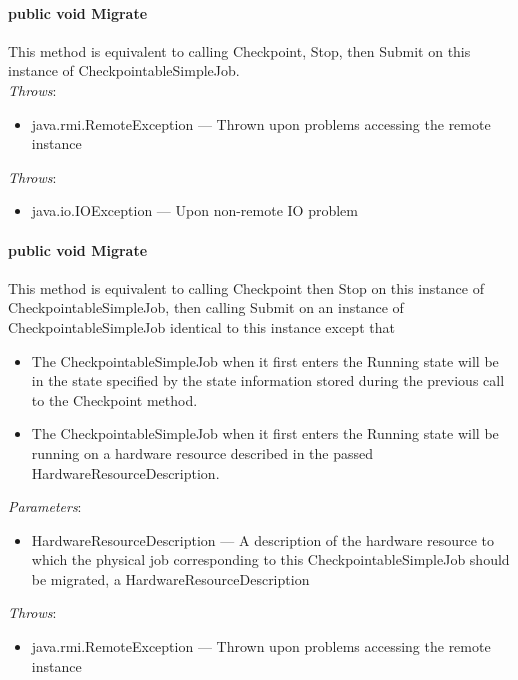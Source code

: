 \documentclass[$Date: 2003/06/26 19:29:31 $]{glabarticle}
\begin{document}
\paragraph{public void Migrate}

This method is equivalent to calling Checkpoint, Stop, then Submit on
this instance of CheckpointableSimpleJob. \\

 \textit{Throws}:
 \begin{itemize}
 \item[] java.rmi.RemoteException --- Thrown upon problems accessing the remote instance 
 \end{itemize}
 
\textit{Throws}:
\begin{itemize}
\item[] java.io.IOException --- Upon non-remote IO problem 
\end{itemize} 

\paragraph{public void Migrate}

This method is equivalent to calling Checkpoint then Stop on this
instance of CheckpointableSimpleJob, then calling Submit on an
instance of CheckpointableSimpleJob identical to this instance except
that

\begin{itemize}
 \item The CheckpointableSimpleJob when it first enters the Running state will be in the state specified by the 
 state information  stored during the previous call to the Checkpoint method.
 \item The CheckpointableSimpleJob when it first enters the Running state will be running on a hardware 
 resource described in the passed HardwareResourceDescription.
\end{itemize}

 \textit{Parameters}:
 \begin{itemize}
 \item[] HardwareResourceDescription --- A description of the hardware resource to which the physical job
 corresponding to this CheckpointableSimpleJob should be migrated, a HardwareResourceDescription
 \end{itemize}

 \textit{Throws}:
 \begin{itemize}
 \item[] java.rmi.RemoteException --- Thrown upon problems accessing the remote instance 
 \end{itemize}
 
\end{document}
